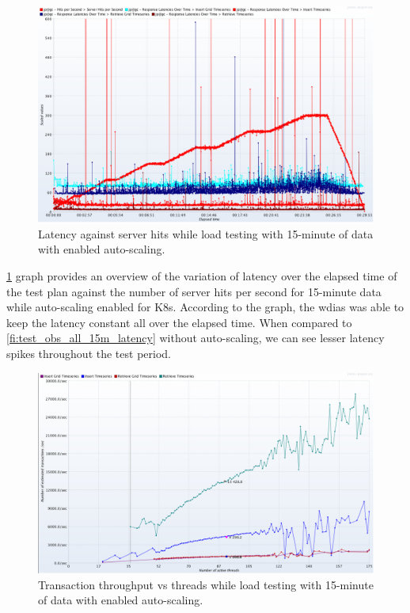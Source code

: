\begin{figure}[htp]
    \centering
    \includegraphics[width=1.0\textwidth]{results/obs/all_auto/obs_all_auto_15m_res_latencies_against_hits.png}
    \caption{Latency against server hits while load testing with 15-minute of data with enabled auto-scaling.}
    \label{fi:test_obs_all_auto_15m_latency}
\end{figure}
\cref{fi:test_obs_all_auto_15m_latency} graph provides an overview of the variation of latency over the elapsed time of the test plan against the number of server hits per second for 15-minute data while auto-scaling enabled for K8s. According to the graph, the \acrshort{wdias} was able to keep the latency constant all over the elapsed time.
When compared to \cref{fi:test_obs_all_15m_latency} without auto-scaling, we can see lesser latency spikes throughout the test period.

\begin{figure}[htp]
    \centering
    \includegraphics[width=1.0\textwidth]{results/obs/all_auto/obs_all_auto_15m_transaction_throughtput_vs_threads.png}
    \caption{Transaction throughput vs threads while load testing with 15-minute of data with enabled auto-scaling.}
    \label{fi:test_obs_all_auto_15m_throughtput}
\end{figure}

